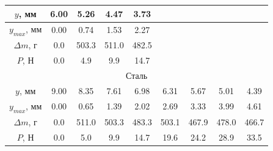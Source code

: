\documentclass[12pt]{article}
\begin{document}
\begin{enumerate}
\begin{table}
\begin{tabular}{|ccccccccc|}
            \multicolumn{1}{|c|}{$y$, мм}       & \multicolumn{1}{c|}{6.00} & \multicolumn{1}{c|}{5.26}  & \multicolumn{1}{c|}{4.47}  & \multicolumn{1}{c|}{3.73}  & \multicolumn{1}{c|}{}      & \multicolumn{1}{c|}{}      & \multicolumn{1}{c|}{}      &       \\ \hline
            \multicolumn{1}{|c|}{$y_{max}$, мм} & \multicolumn{1}{c|}{0.00} & \multicolumn{1}{c|}{0.74}  & \multicolumn{1}{c|}{1.53}  & \multicolumn{1}{c|}{2.27}  & \multicolumn{1}{c|}{}      & \multicolumn{1}{c|}{}      & \multicolumn{1}{c|}{}      &       \\ \hline
            \multicolumn{1}{|c|}{$\Delta m$, г} & \multicolumn{1}{c|}{0.0}  & \multicolumn{1}{c|}{503.3} & \multicolumn{1}{c|}{511.0} & \multicolumn{1}{c|}{482.5} & \multicolumn{1}{c|}{}      & \multicolumn{1}{c|}{}      & \multicolumn{1}{c|}{}      &       \\ \hline
            \multicolumn{1}{|c|}{$P$, Н}        & \multicolumn{1}{c|}{0.0}  & \multicolumn{1}{c|}{4.9}   & \multicolumn{1}{c|}{9.9}   & \multicolumn{1}{c|}{14.7}  & \multicolumn{1}{c|}{}      & \multicolumn{1}{c|}{}      & \multicolumn{1}{c|}{}      &       \\ \hline
            \multicolumn{9}{|c|}{Сталь}                                                                                                                                                                                                                           \\ \hline
            \multicolumn{1}{|c|}{$y$, мм}       & \multicolumn{1}{c|}{9.00} & \multicolumn{1}{c|}{8.35}  & \multicolumn{1}{c|}{7.61}  & \multicolumn{1}{c|}{6.98}  & \multicolumn{1}{c|}{6.31}  & \multicolumn{1}{c|}{5.67}  & \multicolumn{1}{c|}{5.01}  & 4.39  \\ \hline
            \multicolumn{1}{|c|}{$y_{max}$, мм} & \multicolumn{1}{c|}{0.00} & \multicolumn{1}{c|}{0.65}  & \multicolumn{1}{c|}{1.39}  & \multicolumn{1}{c|}{2.02}  & \multicolumn{1}{c|}{2.69}  & \multicolumn{1}{c|}{3.33}  & \multicolumn{1}{c|}{3.99}  & 4.61  \\ \hline
            \multicolumn{1}{|c|}{$\Delta m$, г} & \multicolumn{1}{c|}{0.0}  & \multicolumn{1}{c|}{511.0} & \multicolumn{1}{c|}{503.3} & \multicolumn{1}{c|}{483.3} & \multicolumn{1}{c|}{503.1} & \multicolumn{1}{c|}{467.9} & \multicolumn{1}{c|}{478.0} & 466.7 \\ \hline
            \multicolumn{1}{|c|}{$P$, Н}        & \multicolumn{1}{c|}{0.0}  & \multicolumn{1}{c|}{5.0}   & \multicolumn{1}{c|}{9.9}   & \multicolumn{1}{c|}{14.7}  & \multicolumn{1}{c|}{19.6}  & \multicolumn{1}{c|}{24.2}  & \multicolumn{1}{c|}{28.9}  & 33.5  \\ \hline

\end{tabular}
\end{table}
\end{enumerate}
\end{document}

